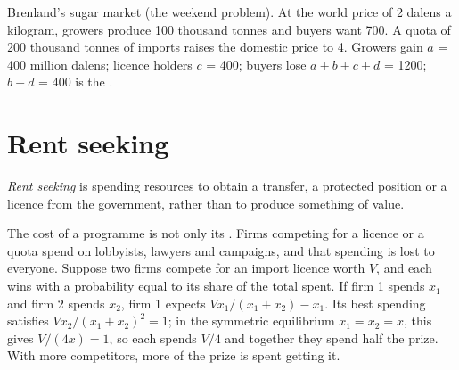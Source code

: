 \begin{omfigure}

{\small Brenland's sugar market (the weekend problem). At the world price of 2 dalens a kilogram, growers produce 100 thousand tonnes and buyers want 700. A quota of 200
thousand tonnes of imports raises the domestic price to 4. Growers gain $a$ = 400 million dalens; licence holders $c$ = 400; buyers lose $a + b + c + d$ = 1200; $b + d$
= 400 is the .}
\end{omfigure}

\section{Rent seeking}\label{sec:g11:public-choice-first-look:rent-seeking}

\begin{definition}\label{def:g11:public-choice-first-look:rent-seeking}
\emph{Rent seeking} is spending resources to obtain a transfer, a protected position or a licence from the government, rather than to produce
something of value.
\end{definition}

The cost of a programme is not only its . Firms competing for a licence or a quota spend on lobbyists, lawyers and campaigns, and that spending is lost
to everyone. Suppose two firms compete for an import licence worth $V$, and each wins with a probability equal to its share of the total spent. If firm 1 spends $x_1$
and firm 2 spends $x_2$, firm 1 expects $V x_1/(x_1 + x_2) - x_1$. Its best spending satisfies $V x_2/(x_1 + x_2)^2 = 1$; in the symmetric equilibrium $x_1 = x_2 = x$,
this gives $V/(4x) = 1$, so each spends $V/4$ and together they spend half the prize. With more competitors, more of the prize is spent getting it.

